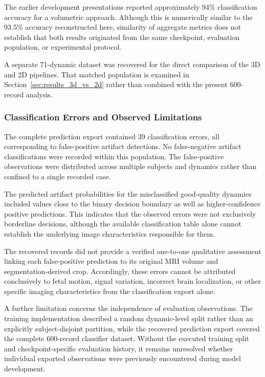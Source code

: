 The earlier development presentations reported approximately 94\% classification accuracy for a volumetric approach. Although this is numerically similar to the 93.5\% accuracy reconstructed here, similarity of aggregate metrics does not establish that both results originated from the same checkpoint, evaluation population, or experimental protocol.

A separate 71-dynamic dataset was recovered for the direct comparison of the 3D and 2D pipelines. That matched population is examined in Section~\ref{sec:results_3d_vs_2d} rather than combined with the present 600-record analysis.

\subsubsection{Classification Errors and Observed Limitations}
\label{subsec:results_3d_classification_errors}

The complete prediction export contained 39 classification errors, all corresponding to false-positive artifact detections. No false-negative artifact classifications were recorded within this population. The false-positive observations were distributed across multiple subjects and dynamics rather than confined to a single recorded case.

The predicted artifact probabilities for the misclassified good-quality dynamics included values close to the binary decision boundary as well as higher-confidence positive predictions. This indicates that the observed errors were not exclusively borderline decisions, although the available classification table alone cannot establish the underlying image characteristics responsible for them.

The recovered records did not provide a verified one-to-one qualitative assessment linking each false-positive prediction to its original MRI volume and segmentation-derived crop. Accordingly, these errors cannot be attributed conclusively to fetal motion, signal variation, incorrect brain localization, or other specific imaging characteristics from the classification export alone.

A further limitation concerns the independence of evaluation observations. The training implementation described a random dynamic-level split rather than an explicitly subject-disjoint partition, while the recovered prediction export covered the complete 600-record classifier dataset. Without the executed training split and checkpoint-specific evaluation history, it remains unresolved whether individual exported observations were previously encountered during model development.


